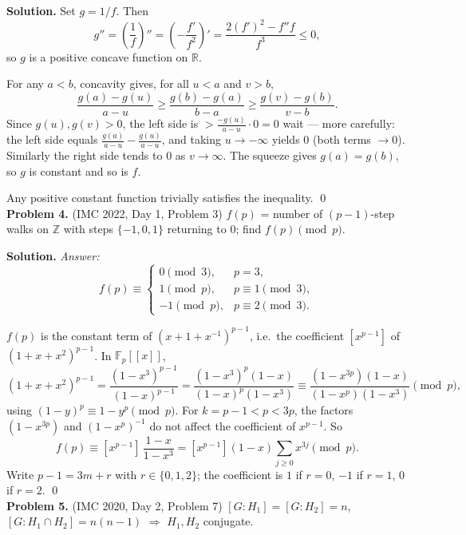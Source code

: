 \documentclass{article}
\newcommand{\R}{\mathbb{R}}
\newcommand{\Z}{\mathbb{Z}}
\newcommand{\F}{\mathbb{F}}
\begin{document}
\textbf{Solution.} Set \( g = 1/f \). Then
\[
g'' = \left(\frac{1}{f}\right)'' = \left(-\frac{f'}{f^2}\right)' = \frac{2(f')^2 - f''f}{f^3} \leq 0,
\]
so \( g \) is a positive concave function on \( \R \).

For any \( a < b \), concavity gives, for all \( u < a \) and \( v > b \),
\[
\frac{g(a) - g(u)}{a - u} \geq \frac{g(b) - g(a)}{b - a} \geq \frac{g(v) - g(b)}{v - b}.
\]
Since \( g(u), g(v) > 0 \), the left side is \( > \frac{-g(u)}{a-u} \cdot 0 = 0 \) wait — more carefully: the left side equals \( \frac{g(a)}{a-u} - \frac{g(u)}{a-u} \), and taking \( u \to -\infty \) yields \( 0 \) (both terms \( \to 0 \)). Similarly the right side tends to \( 0 \) as \( v \to \infty \). The squeeze gives \( g(a) = g(b) \), so \( g \) is constant and so is \( f \).

Any positive constant function trivially satisfies the inequality. \qed
\\

\textbf{Problem 4.} (IMC 2022, Day 1, Problem 3)
\( f(p) \) = number of \( (p-1) \)-step walks on \( \Z \) with steps \( \{-1, 0, 1\} \) returning to \( 0 \); find \( f(p) \pmod p \).

\textbf{Solution.} \textit{Answer:}
\[
f(p) \equiv \begin{cases} 0 \pmod 3, & p = 3, \\ 1 \pmod p, & p \equiv 1 \pmod 3, \\ -1 \pmod p, & p \equiv 2 \pmod 3. \end{cases}
\]

\( f(p) \) is the constant term of \( (x + 1 + x^{-1})^{p-1} \), i.e.\ the coefficient \( [x^{p-1}] \) of \( (1 + x + x^2)^{p-1} \). In \( \F_p[[x]] \),
\[
(1 + x + x^2)^{p-1} = \frac{(1 - x^3)^{p-1}}{(1 - x)^{p-1}}
= \frac{(1 - x^3)^p (1 - x)}{(1 - x)^p (1 - x^3)}
\equiv \frac{(1 - x^{3p})(1 - x)}{(1 - x^p)(1 - x^3)} \pmod p,
\]
using \( (1 - y)^p \equiv 1 - y^p \pmod p \). For \( k = p - 1 < p < 3p \), the factors \( (1 - x^{3p}) \) and \( (1 - x^p)^{-1} \) do not affect the coefficient of \( x^{p-1} \). So
\[
f(p) \equiv [x^{p-1}] \, \frac{1 - x}{1 - x^3} = [x^{p-1}](1 - x) \sum_{j \geq 0} x^{3j} \pmod p.
\]
Write \( p - 1 = 3m + r \) with \( r \in \{0, 1, 2\} \); the coefficient is \( 1 \) if \( r = 0 \), \( -1 \) if \( r = 1 \), \( 0 \) if \( r = 2 \). \qed
\\

\textbf{Problem 5.} (IMC 2020, Day 2, Problem 7)
\( [G:H_1] = [G:H_2] = n \), \( [G : H_1 \cap H_2] = n(n-1) \) \( \Rightarrow \) \( H_1, H_2 \) conjugate.
\end{document}
